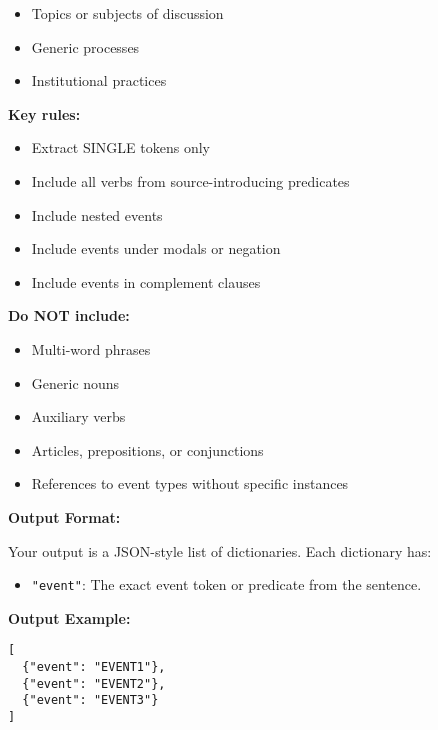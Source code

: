 \begin{figure*}[!ht]
\begin{tcolorbox}[
    width=\textwidth,
    colback=white,
    colframe=black,
    arc=4mm,
    boxrule=0.5pt,
    left=2mm,
    right=2mm,
    top=2mm,
    bottom=2mm,
    fonttitle=\bfseries,
    ]
\begin{tcolorbox}[
    colback=Periwinkle!20,
    boxrule=0pt,
    colframe=white,
    left=0pt,
    right=0pt,
    top=0pt,
    bottom=0pt,
    ]
\begin{enumerate}[noitemsep]
\begin{itemize}[noitemsep, leftmargin=15pt]
\begin{itemize}[noitemsep, leftmargin=20pt]
            \item Topics or subjects of discussion
            \item Generic processes
            \item Institutional practices
        \end{itemize}
    \end{itemize}
\end{enumerate}
\textbf{Key rules:}
\begin{itemize}[noitemsep, leftmargin=15pt]
    \item Extract SINGLE tokens only
    \item Include all verbs from source-introducing predicates 
    \item Include nested events 
    \item Include events under modals or negation
    \item Include events in complement clauses
\end{itemize}
\textbf{Do NOT include:}
\begin{itemize}[noitemsep, leftmargin=15pt]
    \item Multi-word phrases
    \item Generic nouns 
    \item Auxiliary verbs
    \item Articles, prepositions, or conjunctions
    \item References to event types without specific instances
\end{itemize}
\end{tcolorbox}
\begin{tcolorbox}[
    colback=SkyBlue!10,
    boxrule=0pt,
    colframe=white,
    left=0pt,
    right=0pt,
    top=0pt,
    bottom=0pt,
    ]
\small
\textbf{Output Format:}

Your output is a JSON-style list of dictionaries. Each dictionary has:
\begin{itemize}[noitemsep, leftmargin=15pt]
    \item \texttt{"event"}: The exact event token or predicate from the sentence.
\end{itemize}
\textbf{Output Example:}
\begin{verbatim}
[
  {"event": "EVENT1"},
  {"event": "EVENT2"},
  {"event": "EVENT3"}
]
\end{verbatim}
\end{tcolorbox}

\end{tcolorbox}
\label{fig:factbank_event_prompt_zs}
\end{figure*}
